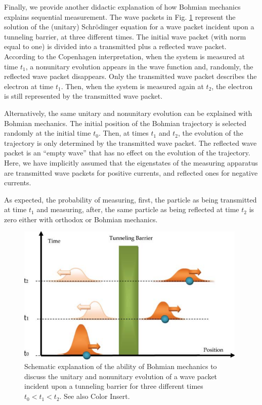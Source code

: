 \documentclass[onecolumn,nofootinbib, secnumarabic, amsmath, nobibnotes,11pt,aps,pra]{revtex4-1}
\newcommand{\fref}[1]{Fig. \ref{#1}}
\begin{document}
Finally, we provide another didactic explanation of how Bohmian
mechanics explains sequential measurement. The wave packets in
\fref{om_sequential} represent the solution of the (unitary)
Schr\"odinger equation for a wave packet incident upon a tunneling
barrier, at three different times. The initial wave packet (with norm
equal to one) is divided into a transmitted plus a reflected wave
packet. According to the Copenhagen interpretation, when the system
is measured at time $t_1$, a nonunitary evolution appears in the
wave function and, randomly, the reflected wave packet disappears.
Only the transmitted wave packet describes the electron at time
$t_1$. Then, when the system is measured again at $t_2$, the
electron is still represented by the transmitted wave packet.\enlargethispage{13pt}


Alternatively, the same unitary and nonunitary evolution can be
explained with Bohmian mechanics. The initial position of the
Bohmian trajectory is selected randomly at the initial time $t_0$.
Then, at times $t_1$ and $t_2$, the evolution of the trajectory is
only determined by the transmitted wave packet. The reflected wave
packet is an ``empty wave'' that has no effect on the evolution of
the trajectory.  Here, we have implicitly assumed that the
eigenstates of the measuring apparatus are transmitted wave packets
for positive currents, and reflected ones for negative currents.

As expected, the probability of measuring, first, the particle as
being transmitted at time $t_1$ and measuring, after, the same
particle as being reflected at time $t_2$ is zero either with
orthodox or Bohmian mechanics.

\begin{figure}
\includegraphics[width=11cm]{ch1-11.pdf}
\caption{Schematic explanation of the ability of Bohmian mechanics to discuss the
unitary and nonunitary evolution of a wave packet incident upon a
tunneling barrier for three different times $t_0 < t_1 < t_2$. See also Color Insert.}
\label{om_sequential}\vspace*{-6pt}
\end{figure}
\end{document}

